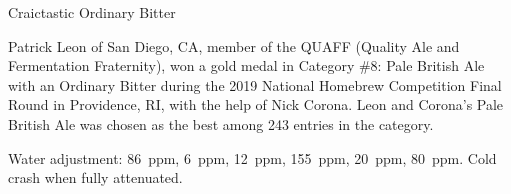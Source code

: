 \stylesection{\stylestandardordinarybitter}

\begin{recipie}{Craictastic Ordinary Bitter}

\begin{aboutblock}
Patrick Leon of San Diego, CA, member of the QUAFF (Quality Ale and Fermentation
Fraternity), won a gold medal in Category \#8: Pale British Ale with an Ordinary
Bitter during the 2019 National Homebrew Competition Final Round in Providence,
RI, with the help of Nick Corona. Leon and Corona's Pale British Ale was chosen as
the best among 243 entries in the category.
\end{aboutblock}


\begin{methodandtiming}
 
\begin{mashsteps}
\end{mashsteps}

\begin{fermentationsteps}
\end{fermentationsteps}

\begin{directions}
Water adjustment:  86~ppm,  6~ppm,  12~ppm,  155~ppm,
 20~ppm,  80~ppm. Cold crash when fully attenuated.
\end{directions}

\end{methodandtiming}

\pagebreak

\begin{ingredientsblock}

\begin{malts}
\end{malts}

\begin{hops}
\end{hops}

\begin{yeasts}
\end{yeasts}

\end{ingredientsblock}

\end{recipie}
